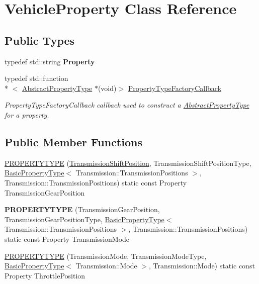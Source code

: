 \hypertarget{classVehicleProperty}{\section{Vehicle\-Property Class Reference}
\label{classVehicleProperty}
}
\subsection*{Public Types}
\begin{DoxyCompactItemize}
\item 
\hypertarget{classVehicleProperty_acf303d050168f571e838813f3e6042d1}{typedef std\-::string {\bfseries Property}}\label{classVehicleProperty_acf303d050168f571e838813f3e6042d1}

\item 
typedef std\-::function\\*
$<$ \hyperlink{classAbstractPropertyType}{Abstract\-Property\-Type} $\ast$(void)$>$ \hyperlink{classVehicleProperty_a6fdd075ce5b867b571020fcdc723ddcf}{Property\-Type\-Factory\-Callback}
\begin{DoxyCompactList}\small\item\em Property\-Type\-Factory\-Callback callback used to construct a \hyperlink{classAbstractPropertyType}{Abstract\-Property\-Type} for a property. \end{DoxyCompactList}\end{DoxyCompactItemize}
\subsection*{Public Member Functions}
\begin{DoxyCompactItemize}
\item 
\hyperlink{classVehicleProperty_a768a0be8079ce3e1645cdc259a84adf7}{P\-R\-O\-P\-E\-R\-T\-Y\-T\-Y\-P\-E} (\hyperlink{classVehicleProperty_ae486d9ea26918460822086b797018800}{Transmission\-Shift\-Position}, Transmission\-Shift\-Position\-Type, \hyperlink{classBasicPropertyType}{Basic\-Property\-Type}$<$ Transmission\-::\-Transmission\-Positions $>$, Transmission\-::\-Transmission\-Positions) static const Property Transmission\-Gear\-Position
\item 
\hypertarget{classVehicleProperty_af9df28b1bc1bef05442b6b1cce40c80e}{{\bfseries P\-R\-O\-P\-E\-R\-T\-Y\-T\-Y\-P\-E} (Transmission\-Gear\-Position, Transmission\-Gear\-Position\-Type, \hyperlink{classBasicPropertyType}{Basic\-Property\-Type}$<$ Transmission\-::\-Transmission\-Positions $>$, Transmission\-::\-Transmission\-Positions) static const Property Transmission\-Mode}\label{classVehicleProperty_af9df28b1bc1bef05442b6b1cce40c80e}

\item 
\hyperlink{classVehicleProperty_ac6527b3ae7e7697c2a23c5903b471172}{P\-R\-O\-P\-E\-R\-T\-Y\-T\-Y\-P\-E} (Transmission\-Mode, Transmission\-Mode\-Type, \hyperlink{classBasicPropertyType}{Basic\-Property\-Type}$<$ Transmission\-::\-Mode $>$, Transmission\-::\-Mode) static const Property Throttle\-Position
\end{DoxyCompactItemize}

